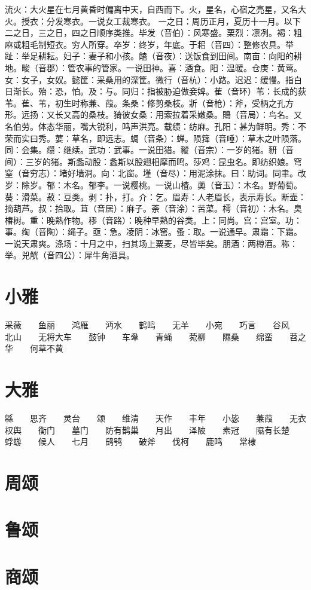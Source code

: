 \documentclass[12pt,UTF8]{ctexbook}
\begin{document}
流火：大火星在七月黄昏时偏离中天，自西而下。火，星名，心宿之亮星，又名大火。授衣：分发寒衣。一说女工裁寒衣。 一之日：周历正月，夏历十一月。以下二之日，三之日，四之日顺序类推。毕发（音伯）：风寒盛。栗烈：凛冽。褐：粗麻或粗毛制短衣。穷人所穿。卒岁：终岁，年底。于耜（音四）：整修农具。举趾：举足耕耘。妇子：妻子和小孩。饁（音夜）：送饭食到田间。南亩：向阳的耕地。畯（音郡）：管农事的管家。一说田神。喜：酒食。阳：温暖。仓庚：黄莺。女：女子，女奴。懿筐：采桑用的深筐。微行（音杭）：小路。迟迟：缓慢。指白日渐长。殆：恐，怕。及：与。同归：指被胁迫做妾婢。萑（音环）苇：长成的荻苇。萑、苇，初生时称蒹、葭。条桑：修剪桑枝。斨（音枪）：斧，受柄之孔方形。远扬：又长又高的桑枝。猗彼女桑：用索拉着采嫩桑。鵙（音局）：鸟名。又名伯劳。体态华丽，嘴大锐利，鸣声洪亮。载绩：纺麻。孔阳：甚为鲜明。秀：不荣而实曰秀。葽：草名，即远志。蜩（音条）：蝉。陨箨（音唾）：草木之叶陨落。同：会集。缵：继续。武功：武事。一说田猎。豵（音宗）：一岁的猪。豜（音间）：三岁的猪。斯螽动股：螽斯以股翅相摩而鸣。莎鸡：昆虫名。即纺织娘。穹窒（音穷志）：堵好墙洞。向：北窗。墐（音尽）：用泥涂抹。曰：助词。同聿。改岁：除岁。郁：木名。郁李。一说樱桃。一说山楂。薁（音玉）：木名。野葡萄。葵：滑菜。菽：豆类。剥：扑，打。介：乞。眉寿：人老眉长，表示寿长。断壶：摘葫芦。叔：拾取。苴（音居）：麻子。荼（音涂）：苦菜。樗（音初）：木名。臭椿树。重：晚熟作物。穋（音路）：晚种早熟的谷类。上：同尚。宫：宫室。功：事。绹（音陶）：绳子。亟：急。凌阴：冰窖。蚤：取。一说通早。肃霜：下霜。一说天肃爽。涤场：十月之中，扫其场上粟麦，尽皆毕矣。朋酒：两樽酒。称：举。兕觥（音四公）：犀牛角酒具。

\part{小雅}
采薇　　鱼丽　　鸿雁　　沔水　　鹤鸣　　无羊　　小宛　　巧言　　谷风　　北山　　无将大车　　鼓钟　　车舝　　青蝇　　菀柳　　隰桑　　绵蛮　　苕之华　　何草不黄
\part{大雅}
緜　　思齐　　灵台　　颂　　维清　　天作　　丰年　　小毖　　蒹葭　　无衣　　权舆　　衡门　　墓门　　防有鹊巢　　月出　　泽陂　　素冠　　隰有长楚　　蜉蝣　　候人　　七月　　鸱鸮　　破斧　　伐柯　　鹿鸣　　常棣
\part{周颂}

\part{鲁颂}

\part{商颂}

\backmatter
\end{document}
